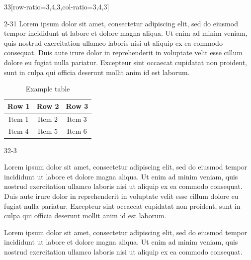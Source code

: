 \documentclass{ropas-poster}
\begin{document}
\begin{postergrid}{3}{3}[row-ratio={3,4,3},col-ratio={3,4,3}]
\begin{posterblock}{2-3}{1}
      Lorem ipsum dolor sit amet, consectetur adipiscing elit, sed do eiusmod tempor incididunt ut labore et dolore magna aliqua.
      Ut enim ad minim veniam, quis nostrud exercitation ullamco laboris nisi ut aliquip ex ea commodo consequat.
      Duis aute irure dolor in reprehenderit in voluptate velit esse cillum dolore eu fugiat nulla pariatur.
      Excepteur sint occaecat cupidatat non proident, sunt in culpa qui officia deserunt mollit anim id est laborum.

      \begin{table}
        \caption{Example table}
        \begin{tabular}{ccc}
          \toprule
          Row 1 & Row 2 & Row 3 \\
          \midrule
          Item 1 & Item 2 & Item 3 \\
          Item 4 & Item 5 & Item 6 \\
          \bottomrule
        \end{tabular}
      \end{table}
    \end{posterblock}

    \begin{posterblock}{3}{2-3}

      Lorem ipsum dolor sit amet, consectetur adipiscing elit, sed do eiusmod tempor incididunt ut labore et dolore magna aliqua.
      Ut enim ad minim veniam, quis nostrud exercitation ullamco laboris nisi ut aliquip ex ea commodo consequat.
      Duis aute irure dolor in reprehenderit in voluptate velit esse cillum dolore eu fugiat nulla pariatur.
      Excepteur sint occaecat cupidatat non proident, sunt in culpa qui officia deserunt mollit anim id est laborum.

      Lorem ipsum dolor sit amet, consectetur adipiscing elit, sed do eiusmod tempor incididunt ut labore et dolore magna aliqua.
      Ut enim ad minim veniam, quis nostrud exercitation ullamco laboris nisi ut aliquip ex ea commodo consequat.
    \end{posterblock}
  \end{postergrid}
\end{document}
